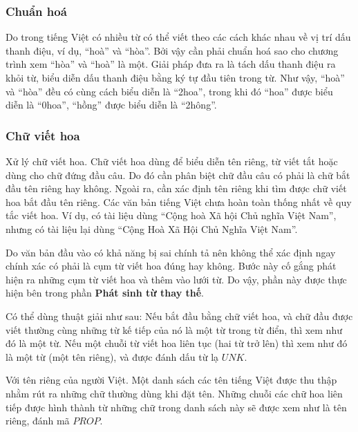 \documentclass[a4paper,oneside]{book} %
\newtheorem{algo}{Thuật toán}
\begin{document}
\subsubsection{Chuẩn hoá}

Do trong tiếng Việt có nhiều từ có thể viết theo các
cách khác nhau về vị trí dấu thanh điệu, ví dụ, ``hoà'' và
``hòa''. Bởi vậy cần phải chuẩn hoá sao cho chương trình xem ``hòa''
và ``hoà'' là một. Giải pháp đưa ra là tách dấu thanh điệu ra khỏi
từ, biểu diễn dấu thanh điệu bằng ký tự đầu tiên trong từ. Như vậy,
``hoà'' và ``hòa'' đều có cùng cách biểu diễn là ``2hoa'', trong khi
đó ``hoa'' được biểu diễn là ``0hoa'', ``hồng'' được biểu diễn là
``2hông''.

\subsubsection{Chữ viết hoa}

Xử lý chữ viết hoa. Chữ viết hoa dùng để biểu diễn tên riêng, từ viết
tắt hoặc dùng cho chữ đứng đầu câu. Do đó cần phân biệt chữ đầu câu có
phải là chữ bắt đầu tên riêng hay không. Ngoài ra, cần xác định tên riêng khi
tìm được chữ viết hoa bắt đầu tên riêng. Các văn bản tiếng Việt chưa
hoàn toàn thống nhất về quy tắc viết hoa. Ví dụ, có tài liệu dùng
``Cộng hoà Xã hội Chủ nghĩa Việt Nam'', nhưng có tài liệu lại dùng
``Cộng Hoà Xã Hội Chủ Nghĩa Việt Nam''.

Do văn bản đầu vào có khả năng bị sai chính tả nên không thể xác định
ngay chính xác có phải là cụm từ viết hoa đúng hay không. Bước này cố
gắng phát hiện ra những cụm từ viết hoa và thêm vào lưới từ. Do vậy,
phần này được thực hiện bên trong phần \textbf{Phát sinh từ thay thế}. 

Có thể dùng thuật giải như sau: Nếu bắt đầu bằng chữ viết hoa, và chữ
đầu được viết thường cùng những từ kế tiếp của nó là một từ trong từ
điển, thì xem như đó là một từ. Nếu một chuỗi từ viết hoa liên tục
(hai từ trở lên) thì xem như đó là một từ (một tên riêng), và được
đánh dấu từ lạ $UNK$.

Với tên riêng của người Việt. Một danh sách các tên tiếng Việt được
thu thập nhằm rút ra những chữ thường dùng khi đặt tên. Những chuỗi
các chữ hoa liên tiếp được hình thành từ những chữ trong danh sách này
sẽ được xem như là tên riêng, đánh mã $PROP$.


\end{document}
